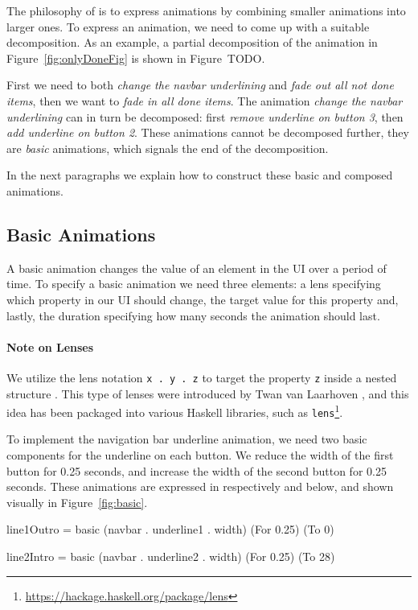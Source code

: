 The philosophy of \dsl{} is to express animations by combining smaller animations into larger ones. To express an animation, we need to come up with a suitable decomposition. As an example, a partial decomposition of the  animation in Figure~\ref{fig:onlyDoneFig} is shown in Figure~TODO.

First we need to both \emph{change the navbar underlining} and \emph{fade out all not done items}, then we want to \emph{fade in all done items}. The animation \emph{change the navbar underlining} can in turn be decomposed: first \emph{remove underline on button 3}, then \emph{add underline on button 2}. These animations cannot be decomposed further, they are \emph{basic} animations, which signals the end of the decomposition.

In the next paragraphs we explain how to construct these basic and composed animations.

\subsection{Basic Animations}

A basic animation changes the value of an element in the UI over a period of time. To specify a basic animation we need three elements: a lens specifying which property in our UI should change, the target value for this property and, lastly, the duration specifying how many seconds the animation should last.

\paragraph{Note on Lenses} We utilize the lens notation \texttt{x . y . z} to target the property \texttt{z} inside a nested structure . This type of lenses were introduced by Twan van Laarhoven \cite{vlLenses}, and this idea has been packaged into various Haskell libraries, such as \texttt{lens}\footnote{\url{https://hackage.haskell.org/package/lens}}.

To implement the navigation bar underline animation, we need two basic components for the underline on each button. We reduce the width of the first button for 0.25 seconds, and increase the width of the second button for 0.25 seconds. These animations are expressed in respectively  and  below, and shown visually in Figure~\ref{fig:basic}.

\begin{spec}
line1Outro = basic (navbar . underline1 . width) (For 0.25) (To 0)

line2Intro = basic (navbar . underline2 . width) (For 0.25) (To 28)
\end{spec}

